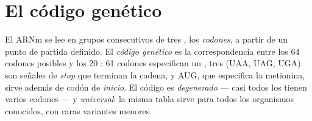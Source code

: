\section{El código genético}

\begin{definition}\label{def:g11:gene-expression:code}
El ARNm se lee en grupos consecutivos de tres , los
\emph{codones}, a partir de un punto de partida definido.
El \emph{código genético} es la correspondencia
entre los 64 codones posibles y los 20 : 61 codones
especifican un , tres (UAA, UAG, UGA) son señales de
\emph{stop} que terminan la cadena, y AUG, que especifica la metionina,
sirve además de codón de \emph{inicio}. El código es
\emph{degenerado} --- casi todos los  tienen varios codones
--- y \emph{universal}: la misma tabla sirve para todos los organismos
conocidos, con raras variantes menores.
\end{definition}


